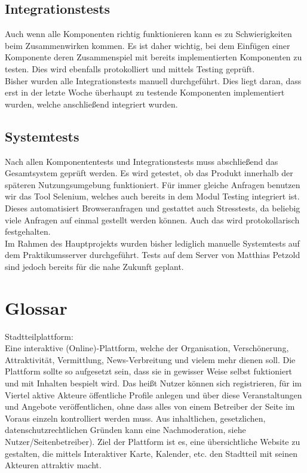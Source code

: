 \documentclass{swp}
\begin{document}
\subsection{Integrationstests}
Auch wenn alle Komponenten richtig funktionieren kann es zu Schwierigkeiten beim Zusammenwirken kommen. Es ist daher wichtig, bei dem Einf\"ugen einer Komponente deren Zusammenspiel mit bereits implementierten Komponenten zu testen. Dies wird ebenfalls protokolliert und mittels \glqq Testing\grqq{} gepr\"uft.\\
Bisher wurden alle Integrationstests manuell durchgef\"uhrt. Dies liegt daran, dass erst in der letzte Woche \"uberhaupt zu testende Komponenten implementiert wurden, welche anschlie{\ss}end integriert wurden.
\subsection{Systemtests}
Nach allen Komponententests und Integrationstests muss abschlie{\ss}end das Gesamtsystem gepr\"uft werden. Es wird getestet, ob das Produkt innerhalb der sp\"ateren Nutzungsumgebung funktioniert. F\"ur immer gleiche Anfragen benutzen wir das Tool \glqq Selenium\grqq{}, welches auch bereits in dem Modul \glqq Testing\grqq{} integriert ist. Dieses automatisiert Browseranfragen und gestattet auch Stresstests, da beliebig viele Anfragen auf einmal gestellt werden k\"onnen. Auch das wird protokollarisch festgehalten.\\
Im Rahmen des Hauptprojekts wurden bisher lediglich manuelle Systemtests auf dem Praktikumsserver durchgef\"uhrt. Tests auf dem Server von Matthias Petzold sind jedoch bereits f\"ur die nahe Zukunft geplant.
\section{Glossar}
Stadtteilplattform: \\Eine interaktive (Online)-Plattform, welche der Organisation, Versch\"onerung, Attraktivit\"at, Vermittlung, \glqq News-Verbreitung\grqq{} und vielem mehr dienen soll. Die Plattform sollte so aufgesetzt sein, dass sie in gewisser Weise selbst fuktioniert und mit Inhalten bespielt wird. Das hei{\ss}t Nutzer k\"onnen sich registrieren, f\"ur im Viertel aktive Akteure \"offentliche Profile anlegen und \"uber diese Veranstaltungen und Angebote ver\"offentlichen, ohne dass alles von einem Betreiber der Seite im Voraus einzeln kontrolliert werden muss. Aus inhaltlichen, gesetzlichen, datenschutzrechtlichen Gr\"unden kann eine Nachmoderation, siehe \glqq Nutzer\grqq{}/\glqq Seitenbetreiber\grqq{}). Ziel der Plattform ist es, eine \"ubersichtliche Website zu gestalten, die mittels Interaktiver Karte, Kalender, etc. den Stadtteil mit seinen Akteuren attraktiv macht.
\end{document}
